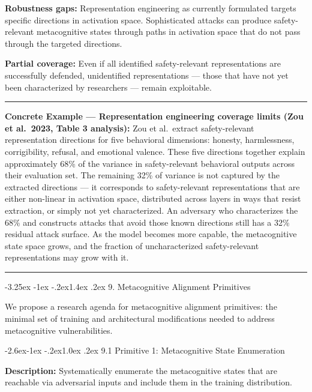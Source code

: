 \documentclass[
  11pt,
]{article}
\makeatletter
\renewcommand\section{\@startsection{section}{1}{\z@}%
  {-3.25ex \@plus -1ex \@minus -.2ex}{1.4ex \@plus.2ex}%
  {\normalfont\sffamily\Large\bfseries}}
\renewcommand\subsection{\@startsection{subsection}{2}{\z@}%
  {-2.6ex\@plus -1ex \@minus -.2ex}{1.0ex \@plus .2ex}%
  {\normalfont\sffamily\large\bfseries}}
\renewenvironment{quote}{%
  \par\addvspace{0.7em}%
  \noindent\rule{\linewidth}{1.2pt}\par\nobreak\vspace{2pt}%
  \begingroup
  \small
  \setlength{\parindent}{0pt}\setlength{\parskip}{0.3em}%
  \setlength{\leftskip}{0.9em}\setlength{\rightskip}{0.4em}%
  \ignorespaces
}{%
  \par\endgroup\vspace{2pt}%
  \noindent\rule{\linewidth}{0.4pt}\par\addvspace{0.7em}%
}
\makeatother
\begin{document}
\textbf{Robustness gaps:} Representation engineering as currently
formulated targets specific directions in activation space.
Sophisticated attacks can produce safety-relevant metacognitive states
through paths in activation space that do not pass through the targeted
directions.

\textbf{Partial coverage:} Even if all identified safety-relevant
representations are successfully defended, unidentified representations
--- those that have not yet been characterized by researchers --- remain
exploitable.

\begin{quote}
\textbf{Concrete Example --- Representation engineering coverage limits
(Zou et al.~2023, Table 3 analysis):} Zou et al.~extract safety-relevant
representation directions for five behavioral dimensions: honesty,
harmlessness, corrigibility, refusal, and emotional valence. These five
directions together explain approximately 68\% of the variance in
safety-relevant behavioral outputs across their evaluation set. The
remaining 32\% of variance is not captured by the extracted directions
--- it corresponds to safety-relevant representations that are either
non-linear in activation space, distributed across layers in ways that
resist extraction, or simply not yet characterized. An adversary who
characterizes the 68\% and constructs attacks that avoid those known
directions still has a 32\% residual attack surface. As the model
becomes more capable, the metacognitive state space grows, and the
fraction of uncharacterized safety-relevant representations may grow
with it.
\end{quote}

\section{9. Metacognitive Alignment
Primitives}\label{metacognitive-alignment-primitives}

We propose a research agenda for metacognitive alignment primitives: the
minimal set of training and architectural modifications needed to
address metacognitive vulnerabilities.

\subsection{9.1 Primitive 1: Metacognitive State
Enumeration}\label{primitive-1-metacognitive-state-enumeration}

\textbf{Description:} Systematically enumerate the metacognitive states
that are reachable via adversarial inputs and include them in the
training distribution.
\end{document}
